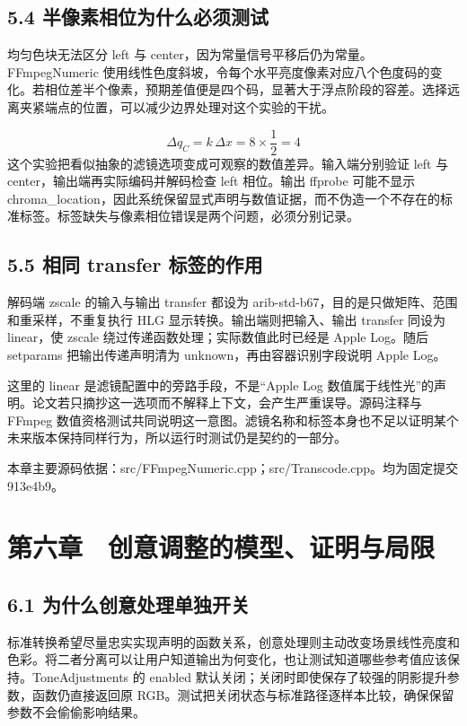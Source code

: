\documentclass[UTF8,zihao=-4,openany]{ctexbook}
\begin{document}
\section*{5.4 半像素相位为什么必须测试}
均匀色块无法区分 left 与 center，因为常量信号平移后仍为常量。FFmpegNumeric 使用线性色度斜坡，令每个水平亮度像素对应八个色度码的变化。若相位差半个像素，预期差值便是四个码，显著大于浮点阶段的容差。选择远离夹紧端点的位置，可以减少边界处理对这个实验的干扰。


\begin{equation}
\Delta q_C=k\,\Delta x=8\times\frac12=4
\end{equation}
这个实验把看似抽象的滤镜选项变成可观察的数值差异。输入端分别验证 left 与 center，输出端再实际编码并解码检查 left 相位。输出 ffprobe 可能不显示 chroma\_location，因此系统保留显式声明与数值证据，而不伪造一个不存在的标准标签。标签缺失与像素相位错误是两个问题，必须分别记录。


\section*{5.5 相同 transfer 标签的作用}
解码端 zscale 的输入与输出 transfer 都设为 arib-std-b67，目的是只做矩阵、范围和重采样，不重复执行 HLG 显示转换。输出端则把输入、输出 transfer 同设为 linear，使 zscale 绕过传递函数处理；实际数值此时已经是 Apple Log。随后 setparams 把输出传递声明清为 unknown，再由容器识别字段说明 Apple Log。

这里的 linear 是滤镜配置中的旁路手段，不是“Apple Log 数值属于线性光”的声明。论文若只摘抄这一选项而不解释上下文，会产生严重误导。源码注释与 FFmpeg 数值资格测试共同说明这一意图。滤镜名称和标签本身也不足以证明某个未来版本保持同样行为，所以运行时测试仍是契约的一部分。


\par\small 本章主要源码依据：src/FFmpegNumeric.cpp；src/Transcode.cpp。均为固定提交 913e4b9。\normalsize

\chapter*{第六章　创意调整的模型、证明与局限}

\section*{6.1 为什么创意处理单独开关}
标准转换希望尽量忠实实现声明的函数关系，创意处理则主动改变场景线性亮度和色彩。将二者分离可以让用户知道输出为何变化，也让测试知道哪些参考值应该保持。ToneAdjustments 的 enabled 默认关闭；关闭时即使保存了较强的阴影提升参数，函数仍直接返回原 RGB。测试把关闭状态与标准路径逐样本比较，确保保留参数不会偷偷影响结果。
\end{document}
